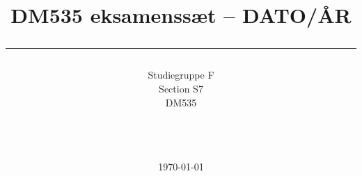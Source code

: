 \documentclass[a4paper,10pt]{article}
\title{DM535 eksamenssæt -- DATO/ÅR \\ \rule{10cm}{0.5mm}}
\author{Studiegruppe F \\ Section S7 \\
DM535\\\rule{5.5cm}{0.5mm}\\}
\date{\today}
\begin{document}
\maketitle

\vfill

\tableofcontents

\newpage
\end{document}
